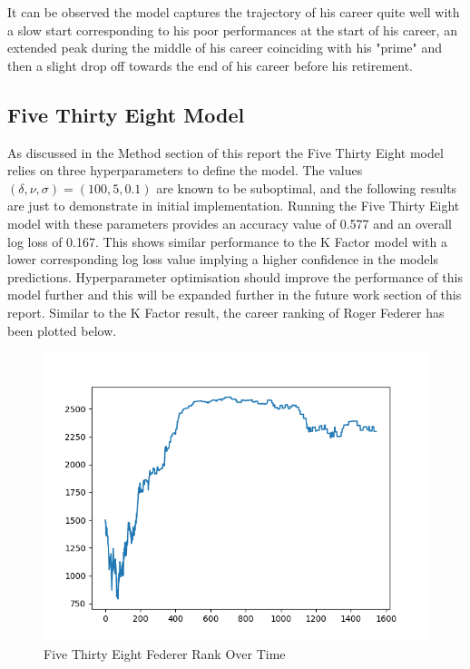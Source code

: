 \documentclass[12pt,a4paper]{article}
\begin{document}
It can be observed the model captures the trajectory of his career quite well with a slow
start corresponding to his poor performances at the start of his career, an extended peak
during the middle of his career coinciding with his "prime" and then a slight drop off
towards the end of his career before his retirement.

\subsection{Five Thirty Eight Model}
As discussed in the Method section of this report the Five Thirty Eight model relies on
three hyperparameters to define the model. The values $(\delta,\nu,\sigma) = (100,5,0.1)$
are known to be suboptimal, and the following results are just to demonstrate in initial
implementation.
Running the Five Thirty Eight model with these parameters provides an accuracy value of
0.577 and an overall log loss of 0.167. This shows similar performance to the K Factor model
with a lower corresponding log loss value implying a higher confidence in the models predictions.
Hyperparameter optimisation should improve the performance of this model further and this
will be expanded further in the future work section of this report. Similar to the K Factor
result, the career ranking of Roger Federer has been plotted below.

\begin{figure}[H]
  \centering
  \includegraphics[scale=0.8]{images/federer_538.png}
  \caption{Five Thirty Eight Federer Rank Over Time}
  \label{fig:federer-538}
\end{figure}
\end{document}
